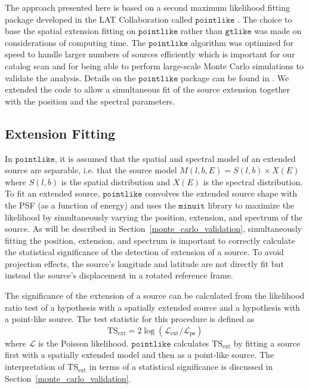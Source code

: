 \documentclass[12pt,preprint]{aastex}
\newcommand{\tsext}{{\ensuremath{\text{TS}_{\text{ext}}}}\xspace}
\newcommand{\likelihood}{\ensuremath{\mathcal{L}}\xspace}
\newcommand{\gtlike}{\ensuremath{\mathtt{gtlike}}\xspace}
\newcommand{\pointlike}{\ensuremath{\mathtt{pointlike}}\xspace}
\newcommand{\minuit}{\ensuremath{\mathtt{minuit}}\xspace}
\begin{document}
The approach presented here is based on a second maximum likelihood
fitting package developed in the LAT Collaboration called \pointlike
\citep{first_cat,matthew_kerr_thesis}.  The choice to base the
spatial extension fitting on \pointlike rather than \gtlike was made
on considerations of computing time.  The \pointlike algorithm was
optimized for speed to handle larger numbers of sources efficiently
which is important for our catalog scan and for being able
to perform large-scale Monte Carlo simulations to validate the analysis.
Details on the \pointlike package can be
found in \cite{matthew_kerr_thesis}.  We extended the code to allow a
simultaneous fit of the source extension together with the position and
the spectral parameters.

\subsection{Extension Fitting}
\label{extension_fitting}

In \pointlike, it is assumed that the spatial and spectral model
of an extended source are separable, i.e. that the source model
$M(l,b,E)=S(l,b)\times X(E)$ where $S(l,b)$ is the spatial distribution
and $X(E)$ is the spectral distribution.  To fit an extended source,
\pointlike convolves the extended source shape with the PSF (as a function
of energy) and uses the \minuit library \citep{minuit_documentation}
to maximize the likelihood by simultaneously varying the position,
extension, and spectrum of the source.  As will be described in
Section~\ref{monte_carlo_validation}, simultaneously fitting the
position, extension, and spectrum is important to correctly calculate
the statistical significance of the detection of extension of a source.
To avoid projection effects, the source's longitude and latitude are
not directly fit but instead the source's displacement in a rotated
reference frame.

The significance of the extension of a source can be calculated from the
likelihood ratio test of a hypothesis with a spatially extended source and
a hypothesis with a point-like source. The test statistic for this procedure
is defined as
\begin{equation}
  \tsext=2\log(\likelihood_\text{ext}/\likelihood_\text{ps}) 
\end{equation}
where \likelihood is the Poisson likelihood.
\pointlike calculates \tsext by fitting a source first with a spatially
extended model and then as a point-like source.  The interpretation
of \tsext in terms of a statistical significance is discussed in
Section~\ref{monte_carlo_validation}.
\end{document}

